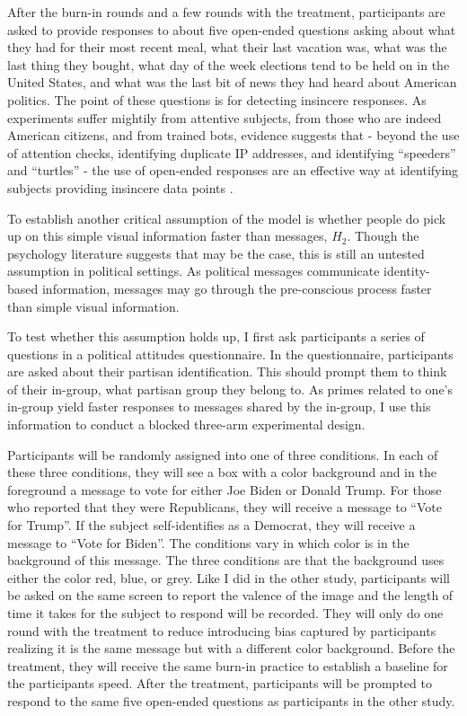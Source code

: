 \documentclass [12pt]{article}
\begin{document}
After the burn-in rounds and a few rounds with the treatment, participants are asked to provide responses to about five open-ended questions asking about what they had for their most recent meal, what their last vacation was, what was the last thing they bought, what day of the week elections tend to be held on in the United States, and what was the last bit of news they had heard about American politics. The point of these questions is for detecting insincere responses. As experiments suffer mightily from attentive subjects, from those who are indeed American citizens, and from trained bots, evidence suggests that - beyond the use of attention checks, identifying duplicate IP addresses, and identifying ``speeders'' and ``turtles'' - the use of open-ended responses are an effective way at identifying subjects providing insincere data points \citep{kennedy_et-al_2021_poq}. 

To establish another critical assumption of the model is whether people do pick up on this simple visual information faster than messages, $H_2$. Though the psychology literature suggests that may be the case, this is still an untested assumption in political settings. As political messages communicate identity-based information, messages may go through the pre-conscious process faster than simple visual information.

To test whether this assumption holds up, I first ask participants a series of questions in a political attitudes questionnaire. In the questionnaire, participants are asked about their partisan identification. This should prompt them to think of their in-group, what partisan group they belong to. As primes related to one's in-group yield faster responses to messages shared by the in-group, I use this information to conduct a blocked three-arm experimental design.

Participants will be randomly assigned into one of three conditions. In each of these three conditions, they will see a box with a color background and in the foreground a message to vote for either Joe Biden or Donald Trump. For those who reported that they were Republicans, they will receive a message to ``Vote for Trump''. If the subject self-identifies as a Democrat, they will receive a message to ``Vote for Biden''. The conditions vary in which color is in the background of this message. The three conditions are that the background uses either the color red, blue, or grey. Like I did in the other study, participants will be asked on the same screen to report the valence of the image and the length of time it takes for the subject to respond will be recorded. They will only do one round with the treatment to reduce introducing bias captured by participants realizing it is the same message but with a different color background. Before the treatment, they will receive the same burn-in practice to establish a baseline for the participants speed. After the treatment, participants will be prompted to respond to the same five open-ended questions as participants in the other study. 
\end{document}
